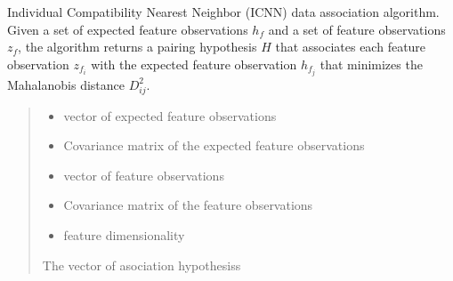 \documentclass[letterpaper,10pt,english]{sphinxmanual}
\begin{document}
\begin{fulllineitems}
\begin{fulllineitems}
\label{\detokenize{FEKFMBLocalization:FEKFMBL.FEKFMBL.ICNN}}
\pysigstartsignatures
{}
\pysigstopsignatures
\sphinxAtStartPar
Individual Compatibility Nearest Neighbor (ICNN) data association algorithm. Given a set of expected feature
observations \(h_f\) and a set of feature observations \(z_f\), the algorithm returns a pairing hypothesis
\(H\) that associates each feature observation \(z_{f_i}\) with the expected feature observation
\(h_{f_j}\) that minimizes the Mahalanobis distance \(D^2_{ij}\).
\begin{quote}\begin{description}
\begin{itemize}
\item {} 
\sphinxAtStartPar
{} \textendash{} vector of expected feature observations

\item {} 
\sphinxAtStartPar
{} \textendash{} Covariance matrix of the expected feature observations

\item {} 
\sphinxAtStartPar
{} \textendash{} vector of feature observations

\item {} 
\sphinxAtStartPar
{} \textendash{} Covariance matrix of the feature observations

\item {} 
\sphinxAtStartPar
{} \textendash{} feature dimensionality

\end{itemize}

\sphinxAtStartPar
The vector of asociation hypothesiss

\end{description}\end{quote}

\end{fulllineitems}



\end{fulllineitems}
\end{document}
